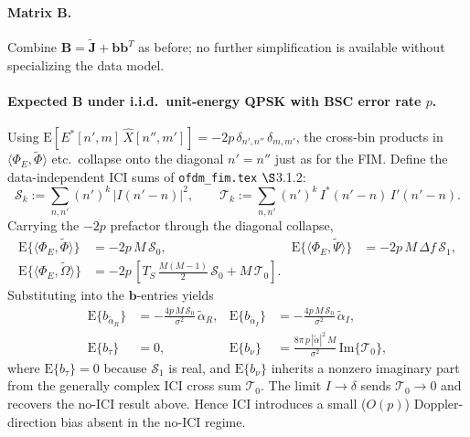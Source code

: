 \documentclass[11pt]{article}
\begin{document}
\paragraph{Matrix \(\bm{B}\).} Combine \(\bm{B} = \tilde{\bm{J}} + \bm{b}\bm{b}^T\) as before; no further simplification is available without specializing the data model.

\paragraph{Expected \(\bm{B}\) under i.i.d.\ unit-energy QPSK with BSC error rate \(p\).} Using \(\mathrm{E}[E^*[n',m]\, \hat{X}[n'',m']] = -2p\, \delta_{n',n''}\, \delta_{m,m'}\), the cross-bin products in \(\langle \Phi_E, \tilde{\Phi}\rangle\) etc.\ collapse onto the diagonal \(n'=n''\) just as for the FIM. Define the data-independent ICI sums of \texttt{ofdm\_fim.tex} \(\S\)3.1.2:
\begin{equation}
    \mathcal{S}_k := \sum_{n,n'} (n')^k\, |I(n'-n)|^2, \qquad \mathcal{T}_k := \sum_{n,n'} (n')^k\, I^*(n'-n)\, I'(n'-n).
\end{equation}
Carrying the \(-2p\) prefactor through the diagonal collapse,
\begin{align}
    \mathrm{E}\{\langle \Phi_E, \tilde{\Phi}\rangle\} &= -2p\, M\, \mathcal{S}_0, &
    \mathrm{E}\{\langle \Phi_E, \tilde{\Psi}\rangle\} &= -2p\, M\, \Delta f\, \mathcal{S}_1, \\
    \mathrm{E}\{\langle \Phi_E, \tilde{\Omega}\rangle\} &= -2p\, \left[ T_S\, \tfrac{M(M-1)}{2}\, \mathcal{S}_0 + M\, \mathcal{T}_0 \right]. & &
\end{align}
Substituting into the \(\bm{b}\)-entries yields
\begin{align}
    \mathrm{E}\{b_{\tilde{\alpha}_R}\} &= -\tfrac{4p\, M\, \mathcal{S}_0}{\sigma^2}\, \tilde{\alpha}_R, &
    \mathrm{E}\{b_{\tilde{\alpha}_I}\} &= -\tfrac{4p\, M\, \mathcal{S}_0}{\sigma^2}\, \tilde{\alpha}_I, \\
    \mathrm{E}\{b_\tau\} &= 0, &
    \mathrm{E}\{b_\nu\} &= \tfrac{8\pi\, p\, |\tilde{\alpha}|^2\, M}{\sigma^2}\, \mathrm{Im}\{\mathcal{T}_0\},
\end{align}
where \(\mathrm{E}\{b_\tau\} = 0\) because \(\mathcal{S}_1\) is real, and \(\mathrm{E}\{b_\nu\}\) inherits a nonzero imaginary part from the generally complex ICI cross sum \(\mathcal{T}_0\). The limit \(I \to \delta\) sends \(\mathcal{T}_0 \to 0\) and recovers the no-ICI result above. Hence ICI introduces a small (\(O(p)\)) Doppler-direction bias absent in the no-ICI regime.
\end{document}
